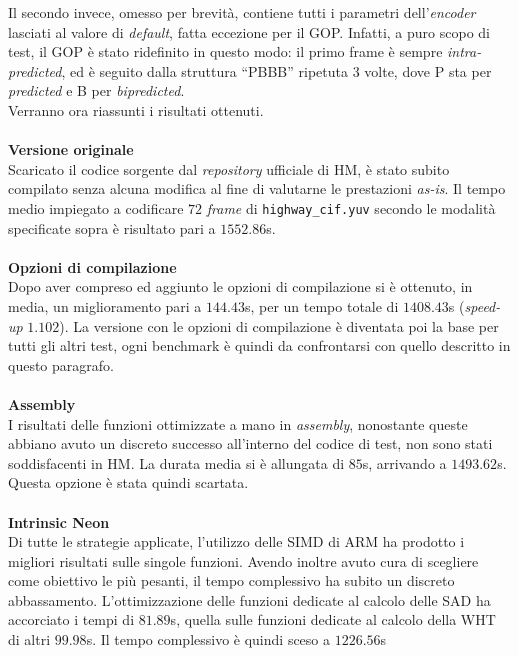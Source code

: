 Il secondo invece, omesso per brevità, contiene tutti i parametri 
dell'\emph{encoder} lasciati al valore di \emph{default}, fatta eccezione per 
il GOP. Infatti, a puro scopo di test, il GOP è stato ridefinito in questo  
modo: il primo frame è sempre \emph{intra-predicted}, ed è seguito dalla 
struttura  
``PBBB''
ripetuta 3 volte, dove P sta per \textit{predicted} e B per 
\textit{bipredicted}.\\
Verranno ora riassunti i risultati ottenuti. 
\\ \\
\textbf{Versione originale}\\
  Scaricato il codice sorgente dal \emph{repository} ufficiale di HM, è stato 
  subito compilato senza alcuna modifica al fine di valutarne le prestazioni 
  \emph{as-is}. Il tempo medio impiegato a codificare $72$ \emph{frame} di 
  \verb|highway_cif.yuv| secondo le modalità specificate sopra è risultato pari 
  a $1552.86$s.
\\ \\
\textbf{Opzioni di compilazione}\\
  Dopo aver compreso ed aggiunto le opzioni di compilazione
  si è ottenuto, in media, un miglioramento pari a $144.43$s, per un tempo 
  totale di $1408.43$s 
  (\textit{speed-up} $1.102$).
  La versione con le opzioni di compilazione è diventata poi la base per tutti 
  gli altri test, ogni benchmark è quindi da confrontarsi con quello descritto 
  in questo paragrafo.
\\ \\
\textbf{Assembly}\\
  I risultati delle funzioni ottimizzate a mano in \emph{assembly}, nonostante 
  queste abbiano avuto un discreto successo all'interno del codice di test, non 
  sono stati soddisfacenti in HM. %
  La durata media si è allungata di $85$s, arrivando a $1493.62$s. Questa 
  opzione è stata quindi scartata.
\\ \\
\textbf{Intrinsic Neon}\\
  Di tutte le strategie applicate, l'utilizzo delle SIMD di ARM ha prodotto i 
  migliori risultati sulle singole funzioni. Avendo inoltre avuto cura di 
  scegliere come obiettivo le più pesanti, il tempo complessivo ha subito un 
  discreto abbassamento.
  L'ottimizzazione delle funzioni dedicate al calcolo delle SAD ha accorciato i 
  tempi di $81.89$s, quella sulle funzioni dedicate al calcolo della WHT di 
  altri $99.98$s. Il tempo complessivo è quindi sceso a $1226.56$s   
